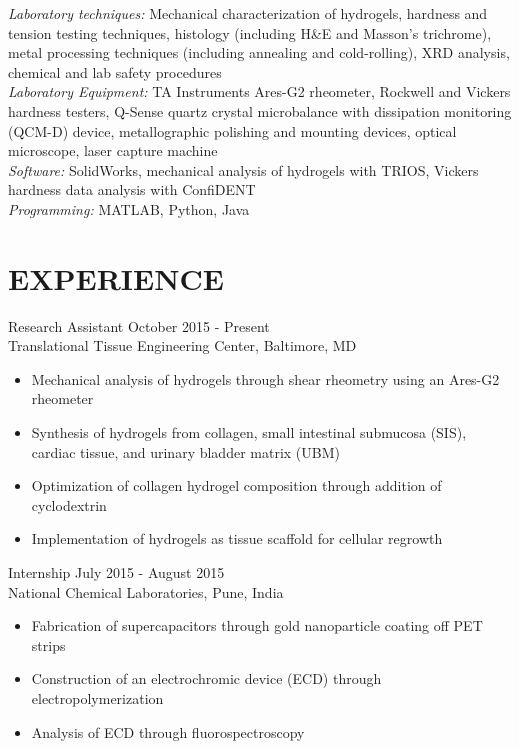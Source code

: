 \documentclass[line, 10pt]{res} %
\begin{document}
\begin{resume}
{\sl Laboratory techniques:} Mechanical characterization of hydrogels, hardness and tension testing techniques, histology (including H\&E and Masson's trichrome), metal processing techniques (including annealing and cold-rolling), XRD analysis, chemical and lab safety procedures \\
{\sl Laboratory Equipment:} TA Instruments Ares-G2 rheometer, Rockwell and Vickers hardness testers, Q-Sense quartz crystal microbalance with dissipation monitoring (QCM-D) device, metallographic polishing and mounting devices, optical microscope, laser capture machine\\
{\sl Software:}  SolidWorks, mechanical analysis of hydrogels with TRIOS, Vickers hardness data analysis with ConfiDENT\\
{\sl Programming:} MATLAB, Python, Java \\
 
\vspace{-0.3cm}
\section{\large EXPERIENCE}

{\sc \large Research Assistant} \hfill October 2015 - Present \\
Translational Tissue Engineering Center, Baltimore, MD
\begin{itemize}
\item Mechanical analysis of hydrogels through shear rheometry using an Ares-G2\\ rheometer
\item Synthesis of hydrogels from collagen, small intestinal submucosa (SIS), cardiac tissue, and urinary bladder matrix (UBM)
\item Optimization of collagen hydrogel composition through addition of cyclodextrin
\item Implementation of hydrogels as tissue scaffold for cellular regrowth
\end{itemize}

{\sc \large Internship} \hfill July 2015 - August 2015\\
National Chemical Laboratories, Pune, India
\begin{itemize}
\item Fabrication of supercapacitors through gold nanoparticle coating off PET strips 
\item Construction of an electrochromic device (ECD) through  electropolymerization
\item Analysis of ECD through fluorospectroscopy
\end{itemize}


\end{resume}
\end{document}
